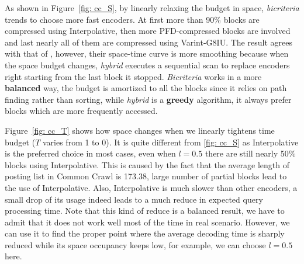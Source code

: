 \documentclass{sig-alternate-05-2015}
\begin{document}
As shown in Figure~\ref{fig: cc_S}, by linearly relaxing the budget in space, \textit{bicriteria} trends to choose more fast encoders.
At first more than 90\% blocks are compressed using Interpolative, then more PFD-compressed blocks are involved and last nearly all of them are compressed using Varint-G8IU.
The result agrees with that of \cite{ottaviano2015optimal}, however, their space-time curve is more smoothing because when the space budget changes, \textit{hybrid} executes a sequential scan to replace encoders right starting from the last block it stopped.
\textit{Bicriteria} works in a more \textbf{balanced} way, the budget is amortized to all the blocks since it relies on path finding rather than sorting, while \textit{hybrid} is a \textbf{greedy} algorithm, it always prefer blocks which are more frequently accessed.

Figure~\ref{fig: cc_T} shows how space changes when we linearly tightens time budget ($ T $ varies from 1 to 0).
It is quite different from \ref{fig: cc_S} as Interpolative is the preferred choice in most cases, even when $ l = 0.5 $ there are still nearly 50\% blocks using Interpolative.
This is caused by the fact that the average length of posting list in Common Crawl is 173.38, large number of partial blocks lead to the use of Interpolative.
Also, Interpolative is much slower than other encoders, a small drop of its usage indeed leads to a much reduce in expected query processing time.
Note that this kind of reduce is a balanced result, we have to admit that it does not work well most of the time in real scenario.
However, we can use it to find the proper point where the average decoding time is sharply reduced while its space occupancy keeps low, for example, we can choose $ l=0.5 $ here.
\end{document}
